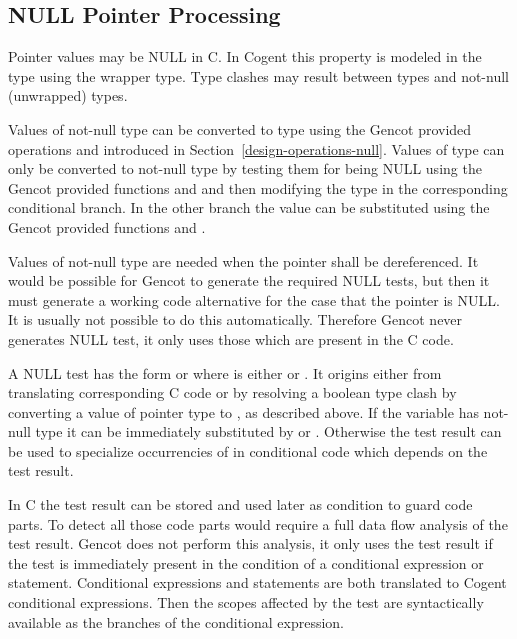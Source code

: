 \subsection{NULL Pointer Processing}
\label{impl-post-null}

Pointer values may be NULL in C. In Cogent this property is modeled in the type using the  wrapper type. Type clashes
may result between  types and not-null (unwrapped) types.

Values of not-null type can be converted to  type using the Gencot provided operations  and 
introduced in Section~\ref{design-operations-null}. Values of  type can only be converted to not-null type by testing them
for being NULL using the Gencot provided functions  and  and then modifying the type in the corresponding
conditional branch. In the other branch the value can be substituted using the Gencot provided functions  and .

Values of not-null type are needed when the pointer shall be dereferenced. It would be possible for Gencot to generate the required
NULL tests, but then it must generate a working code alternative for the case that the pointer is NULL. It is usually not possible to
do this automatically. Therefore Gencot never generates NULL test, it only uses those which are present in the C code.

A NULL test has the form  or  where  is either \code{==} or \code{/=}. It origins
either from translating corresponding C code or by resolving a boolean type clash by converting a value of pointer type to , as
described above. If the variable  has not-null type it can be immediately substituted by  or . Otherwise the
test result can be used to specialize occurrencies of  in conditional code which depends on the test result.

In C the test result can be stored and used later as condition to guard code parts. To detect all those code parts would require a full
data flow analysis of the test result. Gencot does not perform this analysis, it only uses the test result if the test is immediately
present in the condition of a conditional expression or statement. Conditional expressions and statements are both translated to Cogent
conditional expressions. Then the scopes affected by the test are syntactically available as the branches of the conditional expression.

